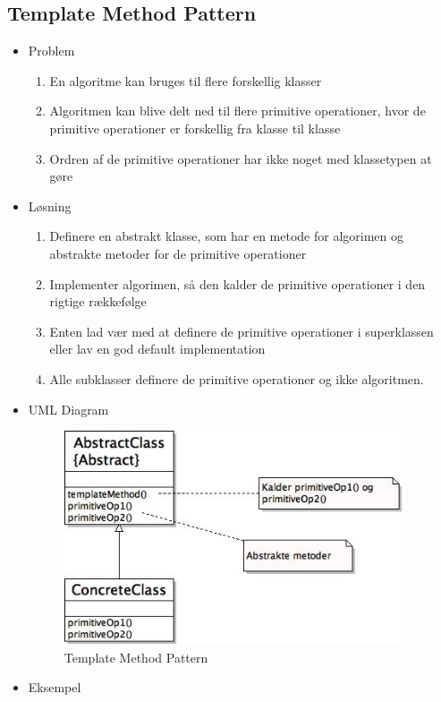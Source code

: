 \documentclass{article}
\begin{document}
\subsection{Template Method Pattern}
	\begin{itemize}
		\item Problem
		\begin{enumerate}
			\item En algoritme kan bruges til flere forskellig klasser
			\item Algoritmen kan blive delt ned til flere primitive operationer, hvor de primitive operationer er forskellig fra klasse til klasse
			\item Ordren af de primitive operationer har ikke noget med klassetypen at gøre
		\end{enumerate}
		\item Løsning
		\begin{enumerate}
			\item Definere en abstrakt klasse, som har en metode for algorimen og abstrakte metoder for de primitive operationer
			\item Implementer algorimen, så den kalder de primitive operationer i den rigtige rækkefølge
			\item Enten lad vær med at definere de primitive operationer i superklassen eller lav en god default implementation
			\item Alle subklasser definere de primitive operationer og ikke algoritmen.  
		\end{enumerate}
		\newpage
		\item UML Diagram
		\begin{figure}[ht!]
			\centering
			\includegraphics[width=100mm]{img/templateUML.jpeg}
			\caption{Template Method Pattern  \label{UMLDesign3}}
		\end{figure}
		\item Eksempel
		\begin{itemize}

\end{itemize}
\end{itemize}
\end{document}
